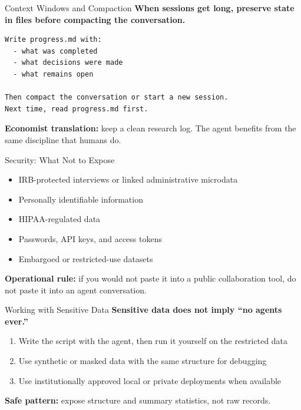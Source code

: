 \documentclass[10pt,english,aspectratio=169]{beamer}
\begin{document}
\begin{frame}[fragile]{Context Windows and Compaction}
\textbf{When sessions get long, preserve state in files before compacting the conversation.}

\vspace{0.2cm}

\begin{lstlisting}[style=pythonstyle,language={},basicstyle=\ttfamily\scriptsize]
Write progress.md with:
  - what was completed
  - what decisions were made
  - what remains open

Then compact the conversation or start a new session.
Next time, read progress.md first.
\end{lstlisting}

\vspace{0.2cm}

\textbf{Economist translation:} keep a clean research log. The agent benefits from the same discipline that humans do.
\end{frame}

\begin{frame}{Security: What Not to Expose}
\begin{itemize}
    \item IRB-protected interviews or linked administrative microdata
    \item Personally identifiable information
    \item HIPAA-regulated data
    \item Passwords, API keys, and access tokens
    \item Embargoed or restricted-use datasets
\end{itemize}

\vspace{0.3cm}

\textbf{Operational rule:} if you would not paste it into a public collaboration tool, do not paste it into an agent conversation.
\end{frame}

\begin{frame}{Working with Sensitive Data}
\textbf{Sensitive data does not imply ``no agents ever.''}

\vspace{0.25cm}

\begin{enumerate}
    \item Write the script with the agent, then run it yourself on the restricted data
    \item Use synthetic or masked data with the same structure for debugging
    \item Use institutionally approved local or private deployments when available
\end{enumerate}

\vspace{0.3cm}

\textbf{Safe pattern:} expose structure and summary statistics, not raw records.
\end{frame}
\end{document}
